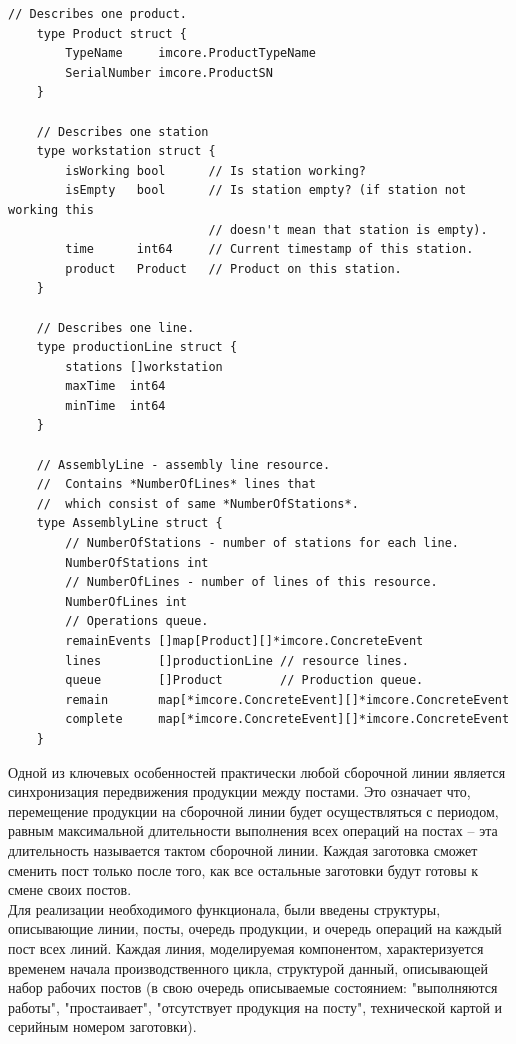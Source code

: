 \begin{lstlisting}[caption={Структуры сборочной линии},label={lst:resource},language=Golang]
	// Describes one product.
	type Product struct {
		TypeName     imcore.ProductTypeName
		SerialNumber imcore.ProductSN
	}

	// Describes one station
	type workstation struct {
		isWorking bool		// Is station working?
		isEmpty   bool		// Is station empty? (if station not working this 
							// doesn't mean that station is empty).
		time      int64		// Current timestamp of this station.
		product   Product 	// Product on this station.
	}
	
	// Describes one line.
	type productionLine struct {
		stations []workstation
		maxTime  int64
		minTime  int64
	}
	
	// AssemblyLine - assembly line resource.
	//	Contains *NumberOfLines* lines that 
	//	which consist of same *NumberOfStations*.
	type AssemblyLine struct {
		// NumberOfStations - number of stations for each line.
		NumberOfStations int
		// NumberOfLines - number of lines of this resource.
		NumberOfLines int
		// Operations queue.
		remainEvents []map[Product][]*imcore.ConcreteEvent
		lines        []productionLine // resource lines.
		queue        []Product        // Production queue.
		remain       map[*imcore.ConcreteEvent][]*imcore.ConcreteEvent
		complete     map[*imcore.ConcreteEvent][]*imcore.ConcreteEvent
	}
\end{lstlisting}

\indent Одной из ключевых особенностей практически любой сборочной линии является синхронизация передвижения продукции между постами.
Это означает что, перемещение продукции на сборочной линии будет осуществляться с периодом, равным максимальной длительности выполнения всех операций на постах -- эта длительность называется тактом сборочной линии.
Каждая заготовка сможет сменить пост только после того, как все остальные заготовки будут готовы к смене своих постов.\\
\indent Для реализации необходимого функционала, были введены структуры, описывающие линии, посты, очередь продукции, и очередь операций на каждый пост всех линий.
Каждая линия, моделируемая компонентом, характеризуется временем начала производственного цикла, структурой данный, описывающей набор рабочих постов (в свою очередь описываемые состоянием: "выполняются работы", "простаивает", "отсутствует продукция на посту", технической картой и серийным номером заготовки).

